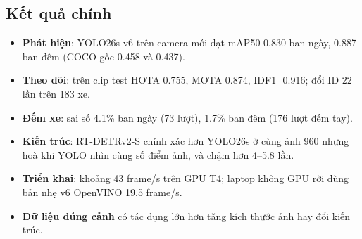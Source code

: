 \documentclass[aspectratio=\mlwAspectRatio, \mlwBaseSize, t]{beamer}
\begin{document}
\subsection{Kết quả chính}
\begin{frame}{\stitle}
  \begin{itemize}
    \item \textbf{Phát hiện}: YOLO26s-v6 trên camera mới đạt mAP50 0.830 ban ngày, \alert{0.887 ban đêm} (COCO gốc 0.458
          và 0.437).
    \item \textbf{Theo dõi}: trên clip test HOTA 0.755, MOTA 0.874, IDF1~\,0.916; đổi ID 22 lần trên 183 xe.
    \item \textbf{Đếm xe}: sai số 4.1\% ban ngày (73 lượt), \alert{1.7\%} ban đêm (176 lượt đếm tay).
    \item \textbf{Kiến trúc}: RT-DETRv2-S chính xác hơn YOLO26s ở cùng ảnh 960 nhưng hoà khi YOLO nhìn cùng số điểm ảnh,
          và chậm hơn 4--5.8 lần.
    \item \textbf{Triển khai}: khoảng 43 frame/s trên GPU T4; laptop không GPU rời dùng bản nhẹ v6 OpenVINO 19.5 frame/s.
    \item \textbf{Dữ liệu đúng cảnh} có tác dụng lớn hơn tăng kích thước ảnh hay đổi kiến trúc.
  \end{itemize}
\end{frame}
\end{document}
